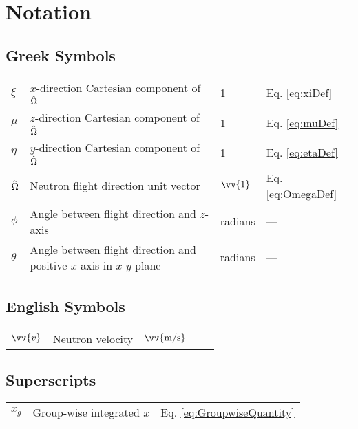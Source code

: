 \section{Notation}

\subsection{Greek Symbols}

\begin{tabular}{l l l l}
\(\xi\) & \(x\)-direction Cartesian component of \(\hat{\Omega}\) & 1 & Eq. \eqref{eq:xiDef}\\
\(\mu\) & \(z\)-direction Cartesian component of \(\hat{\Omega}\) & 1 & Eq. \eqref{eq:muDef}\\
\(\eta\) & \(y\)-direction Cartesian component of \(\hat{\Omega}\) & 1 & Eq. \eqref{eq:etaDef}\\
\(\hat{\Omega}\) & Neutron flight direction unit vector & \(\vv{1}\) & Eq. \eqref{eq:OmegaDef}\\
\(\phi\) & Angle between flight direction and \(z\)-axis & radians & ---\\
\(\theta\) & Angle between flight direction and positive \(x\)-axis in \(x\)-\(y\) plane & radians & ---\\
\end{tabular}

\subsection{English Symbols}

\begin{tabular}{l l l l}
\(\vv{v}\) & Neutron velocity & \(\vv{\text{m/s}}\) & ---\\
\end{tabular}

\subsection{Superscripts}

\begin{tabular}{l l l}
\(x_g\) & Group-wise integrated \(x\) & Eq. \eqref{eq:GroupwiseQuantity}\\
\end{tabular}
